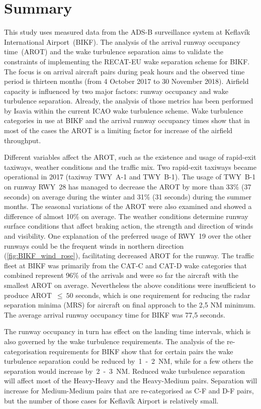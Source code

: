 




\chapter{Summary}\label{cha:summary}
This study uses measured data from the ADS-B surveillance system at Keflavík International Airport~(BIKF). The analysis of the arrival runway occupancy time~(AROT) and the wake turbulence separation aims to validate the constraints of implementing the RECAT-EU wake  separation scheme for BIKF. The focus is on arrival aircraft pairs during peak hours and the observed time period is thirteen months (from 4 October 2017 to 30 November 2018). 
Airfield capacity is influenced by two major factors: runway occupancy and wake turbulence separation. Already, the analysis of those metrics has been performed by Isavia within the current ICAO wake turbulence scheme. Wake turbulence categories in use at BIKF and the arrival runway occupancy times show that in most of the cases the AROT is a limiting factor for increase of the airfield throughput.  

Different variables affect the AROT, such as the existence and usage of rapid-exit taxiways, weather conditions and the traffic mix. Two rapid-exit taxiways became operational in 2017 (taxiway TWY~A-1 and TWY~B-1). The usage of TWY~B-1 on runway RWY~28 has managed to decrease the AROT by more than 33\% (37 seconds) on average during the winter and 31\% (31 seconds) during the summer months. The seasonal variations of the AROT were also examined and showed a difference of almost 10\% on average. The weather conditions determine runway surface conditions that affect braking action, the strength and direction of winds and visibility. One explanation of the preferred usage of RWY~19 over the other runways could be the frequent winds in northern direction (\ref{fig:BIKF_wind_rose}), facilitating decreased AROT for the runway. The traffic fleet at BIKF was primarily from the CAT-C and CAT-D wake categories that combined represent 96\% of the arrivals and were so far the aircraft with the smallest AROT on average. Nevertheless the above conditions were insufficient to produce AROT~$\leq~50$ seconds, which is one requirement for reducing the radar separation minima (MRS) for aircraft on final approach to the 2,5 NM minimum. The average arrival runway occupancy time for BIKF was 77,5 seconds. 

The runway occupancy in turn has effect on the landing time intervals, which is also governed by the wake turbulence requirements.
The analysis of the re-categorisation requirements for BIKF show that for certain pairs the wake turbulence separation could be reduced by~1~-~2~NM, while for a few others the separation would increase by~2~-~3~NM. Reduced wake turbulence separation will affect most of the Heavy-Heavy and the Heavy-Medium pairs. Separation will increase for Medium-Medium pairs that are re-categorised as C-F and D-F pairs, but the number of those cases for Keflavík Airport is relatively small.

